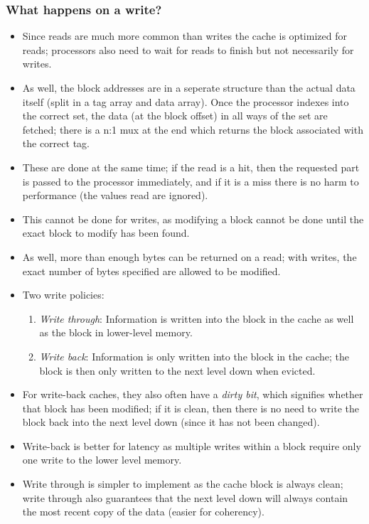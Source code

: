 \documentclass[11pt, a4paper]{article}
\theoremstyle{definition}
\theoremstyle{remark}
\begin{document}
\subsubsection{What happens on a write?}
\begin{itemize}
  \item Since reads are much more common than writes the cache is optimized for reads; processors also need to wait for reads to finish but not necessarily for writes.
  \item As well, the block addresses are in a seperate structure than the actual data itself (split in a tag array and data array). Once the processor indexes into the correct set, the data (at the block offset) in all ways of the set are fetched; there is a n:1 mux at the end which returns the block associated with the correct tag.
  \item These are done at the same time; if the read is a hit, then the requested part is passed to the processor immediately, and if it is a miss there is no harm to performance (the values read are ignored).
  \item This cannot be done for writes, as modifying a block cannot be done until the exact block to modify has been found.
  \item As well, more than enough bytes can be returned on a read; with writes, the exact number of bytes specified are allowed to be modified.
  \item Two write policies:
  \begin{enumerate}
    \item \textit{Write through}: Information is written into the block in the cache as well as the block in lower-level memory.
    \item \textit{Write back}: Information is only written into the block in the cache; the block is then only written to the next level down when evicted.
  \end{enumerate}
  \item For write-back caches, they also often have a \textit{dirty bit}, which signifies whether that block has been modified; if it is clean, then there is no need to write the block back into the next level down (since it has not been changed).
  \item Write-back is better for latency as multiple writes within a block require only one write to the lower level memory.
  \item Write through is simpler to implement as the cache block is always clean; write through also guarantees that the next level down will always contain the most recent copy of the data (easier for coherency).

\end{itemize}
\end{document}
